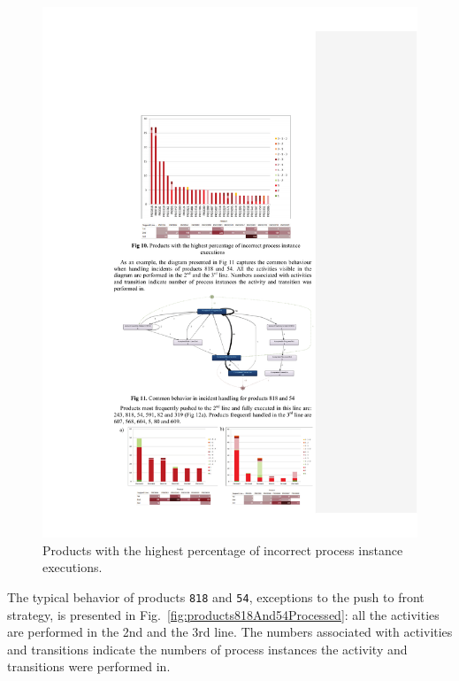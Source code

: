 \documentclass[lnbip]{svmultln}
\begin{document}
\begin{figure}
\centering
\includegraphics[width=.8\textwidth]{"figs/pic 12"}
\caption{Products with the highest percentage of incorrect process instance executions.}
\label{fig:productsIncorrectlyProcessedPercentage}
\end{figure}
 
The typical behavior of products \texttt{818} and \texttt{54}, exceptions to the push to front strategy, is presented in Fig.~\ref{fig:products818And54Processed}: all the activities are performed in the 2nd and the 3rd line. The numbers associated with activities and transitions indicate the numbers of process instances the activity and transitions were performed in.
 
\end{document}
